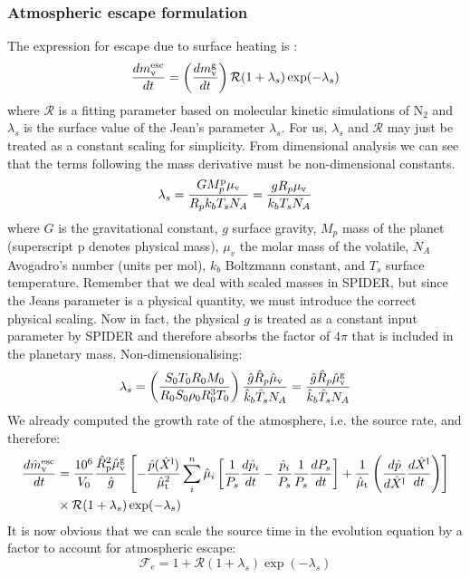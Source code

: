 \subsubsection{Atmospheric escape formulation}
The expression for escape due to surface heating is \citep{JOY15}: %
\begin{equation}
\frac{d m_{\rm v}^{\rm esc}}{dt} = \left( \frac{d m_{\rm v}^{\rm g}}{dt} \right) \mathcal{R} (1 + \lambda_s) \exp(-\lambda_s) 
\end{equation}
where $\mathcal{R}$ is a fitting parameter based on molecular kinetic simulations of N$_2$ \citep{VJT11,VTE11} and $\lambda_s$ is the surface value of the Jean's parameter $\lambda_s$.  For us, $\lambda_s$ and $\mathcal{R}$ may just be treated as a constant scaling for simplicity.  From dimensional analysis we can see that the terms following the mass derivative must be non-dimensional constants.
\begin{equation}
\lambda_s =  \frac{G M_p^{\rm p} \mu_{\rm v}}{R_p k_b T_s N_A} = \frac{g R_p \mu_{\rm v}}{k_b T_s N_A}
\end{equation}
where $G$ is the gravitational constant, $g$ surface gravity, $M_p$ mass of the planet (superscript p denotes physical mass), $\mu_v$ the molar mass of the volatile, $N_A$ Avogadro's number (units per mol), $k_b$ Boltzmann constant, and $T_s$ surface temperature.  Remember that we deal with scaled masses in SPIDER, but since the Jeans parameter is a physical quantity, we must introduce the correct physical scaling.  Now in fact, the physical $g$ is treated as a constant input parameter by SPIDER and therefore absorbs the factor of $4 \pi$ that is included in the planetary mass.  Non-dimensionalising:
\begin{equation}
\lambda_s = \left( \frac{S_0 T_0 R_0 M_0}{R_0 S_0 \rho_0 R_0^3 T_0} \right) \frac{\hat{g} \hat{R}_p \hat{\mu}_{\rm v}}{\hat{k}_b \hat{T}_s N_A} = \frac{\hat{g} \hat{R}_p \hat{\mu}_{\rm v}^{\rm g}}{\hat{k}_b \hat{T}_s N_A}
\end{equation}
We already computed the growth rate of the atmosphere, i.e. the source rate, and therefore:
\begin{align}
\frac{d \hat{m}_{\rm v}^{\rm esc}}{dt} &= \frac{10^6}{V_0} \frac{\hat{R}_{\rm p}^2 \hat{\mu}_{\rm v}^{\rm g}}{\hat{g}}
\left[
-\frac{\hat{p}(\hat{X}^{\rm l})}{\hat{\mu}_{\rm t}^2} \sum_i^n \hat{\mu}_i \left[ \frac{1}{P_s} \frac{d \hat{p}_i}{d t} - \frac{\hat{p}_i}{P_s} \frac{1}{P_s} \frac{d P_s}{d t} \right] + \frac{1}{\hat{\mu}_{\rm t}} \left( \frac{d \hat{p}}{d \hat{X}^{\rm l}} \frac{d \hat{X}^{\rm l}}{d t} \right)
\right]\\
& \times \mathcal{R} (1 + \lambda_s) \exp(-\lambda_s) 
\end{align}
It is now obvious that we can scale the source time in the evolution equation by a factor to account for atmospheric escape:
\begin{equation}
\mathcal{F}_e = 1+\mathcal{R} (1 + \lambda_s) \exp(-\lambda_s)
\end{equation}
